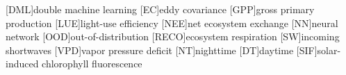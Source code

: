\begin{acronym}
[DML]{double machine learning}
[EC]{eddy covariance}
[GPP]{gross primary production}
[LUE]{light-use efficiency}
[NEE]{net ecosystem exchange}
[NN]{neural network}
[OOD]{out-of-distribution}
[RECO]{ecosystem respiration}
[SW]{incoming shortwaves}
[VPD]{vapor pressure deficit}
[NT]{nighttime}
[DT]{daytime}
[SIF]{solar-induced chlorophyll fluorescence}
\end{acronym}

